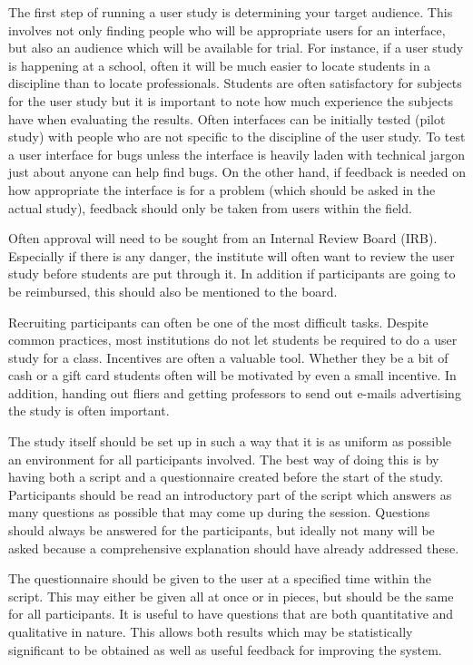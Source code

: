 The first step of running a user study is determining your target audience.  This involves not only finding people who will be appropriate users for an interface, but also an audience which will be available for trial.  For instance, if a user study is happening at a school, often it will be much easier to locate students in a discipline than to locate professionals.  Students are often satisfactory for subjects for the user study but it is important to note how much experience the subjects have when evaluating the results.  Often interfaces can be initially tested (pilot study) with people who are not specific to the discipline of the user study.  To test a user interface for bugs unless the interface is heavily laden with technical jargon just about anyone can help find bugs.  On the other hand, if feedback is needed on how appropriate the interface is for a problem (which should be asked in the actual study), feedback should only be taken from users within the field.

Often approval will need to be sought from an Internal Review Board (IRB).  Especially if there is any danger, the institute will often want to review the user study before students are put through it.  In addition if participants are going to be reimbursed, this should also be mentioned to the board.

Recruiting participants can often be one of the most difficult tasks.  Despite common practices, most institutions do not let students be required to do a user study for a class.  Incentives are often a valuable tool.  Whether they be a bit of cash or a gift card students often will be motivated by even a small incentive.  In addition, handing out fliers and getting professors to send out e-mails advertising the study is often important.

The study itself should be set up in such a way that it is as uniform as possible an environment for all participants involved.  The best way of doing this is by having both a script and a questionnaire created before the start of the study.  Participants should be read an introductory part of the script which answers as many questions as possible that may come up during the session.  Questions should always be answered for the participants, but ideally not many will be asked because a comprehensive explanation should have already addressed these.  

The questionnaire should be given to the user at a specified time within the script.  This may either be given all at once or in pieces, but should be the same for all participants.  It is useful to have questions that are both quantitative and qualitative in nature.  This allows both results which may be statistically significant to be obtained as well as useful feedback for improving the system.

